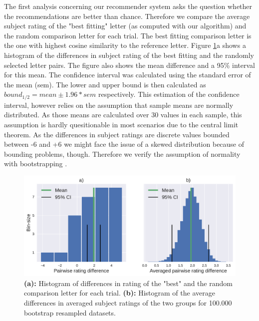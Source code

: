 The first analysis concerning our recommender system asks the question whether the recommendations are better than chance. Therefore we compare the average subject rating of the "best fitting" letter (as computed with our algorithm) and the random comparison letter for each trial. The best fitting comparison letter is the one with highest cosine similarity to the reference letter. %
Figure \ref{fig:both_diff_tf}a shows a histogram of the differences in subject rating of the best fitting and the randomly selected letter pairs. The figure also shows the mean difference and a 95\% interval for this mean. The confidence interval was calculated using the standard error of the mean (sem). The lower and upper bound is then calculated as $bound_{1/2} = mean \pm 1.96 * sem$ respectively. This estimation of the confidence interval, however relies on the assumption that sample means are normally distributed. As those means are calculated over 30 values in each sample, this assumption is hardly quesitionable in most scenarios due to the central limit theorem. As the differences in subject ratings are discrete values bounded between -6 and +6 we might face the issue of a skewed distribution because of bounding problems, though. Therefore we verify the assumption of normality with bootstrapping \citep{Efron1979}.
\begin{figure}[h]
	\includegraphics[width=\textwidth]{figures/both_diff_tf}
	\caption{\textbf{(a):} Histogram of differences in rating of the "best" and the random comparison letter for each trial.
		\textbf{(b):} Histogram of the average differences in averaged subject ratings of the two groups for 100.000 bootstrap resampled datasets.}
	\label{fig:both_diff_tf}
\end{figure}
